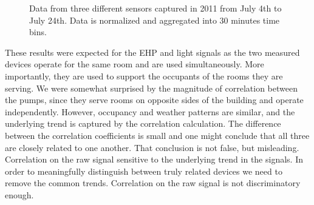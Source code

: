 \begin{figure}
 \caption{Data from three different sensors captured in 2011 from July 4th to July 24th. Data is normalized and aggregated into 30 minutes time bins.}
 \label{fig:raw}
\end{figure}



These results were expected for the EHP and light signals as the two measured devices operate for the same room 
and are used simultaneously.  More importantly, they are used to support the occupants of the rooms they are serving.
We were somewhat surprised by the magnitude of correlation between the pumps, since they serve rooms on
opposite sides of the building and operate independently.  However, occupancy and weather patterns are similar,
and the underlying trend is captured by the correlation calculation.
The difference between the correlation coefficients is small and one might conclude that all three are
closely related to one another.  That conclusion is not false, but misleading.  Correlation on the raw 
signal sensitive to the underlying trend in the signals.  In order to meaningfully distinguish between
truly related devices we need to remove the common trends.  Correlation on the raw signal is not
discriminatory enough.


